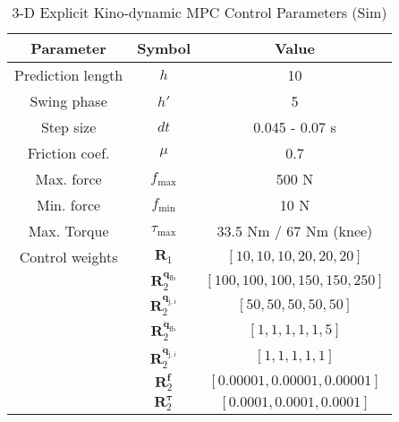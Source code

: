\begin{table}[H]
	\vspace{0.2cm}
	\centering
	\caption{3-D Explicit Kino-dynamic MPC Control Parameters (Sim)}
	\begin{tabular}{ccc}
	\hline
	Parameter & Symbol & Value \\
	\hline
	Prediction length & $h$  &  10 \\
        Swing phase & $h'$ & 5 \\
        Step size & $dt$  &  0.045 - 0.07 s \\
        Friction coef. & $\mu$  &  0.7 \\
        Max. force & $f_\text{max}$  &  500 N \\
        Min. force & $f_\text{min}$  &  10 N \\
        Max. Torque & $\tau_\text{max}$ & 33.5 Nm / 67 Nm (knee)\\
        Control weights & $\bm R_1$  &  $[10, 10, 10, 20, 20, 20]$ \\
        & $\bm R_2^{\bm q_\text{fb}}$  &  $[100, 100, 100, 150, 150, 250]$ \\
        & $\bm R_2^{\bm q_{\text{j},i}}$  &  $[50,50,50,50,50]$ \\
        & $\bm R_2^{\dot{\bm q}_\text{fb}}$  &  $[1, 1, 1, 1, 1, 5]$ \\
        & $\bm R_2^{\dot{\bm q}_{\text{j},i}}$  &  $[1,1,1,1,1]$ \\
        & $\bm R_2^{\bm f}$ & $[0.00001, 0.00001, 0.00001]$ \\
        & $\bm R_2^{\bm \tau}$ & $[0.0001, 0.0001, 0.0001]$  \\
	\hline 
	\end{tabular}
	\vspace{0.2cm}
\end{table}	

